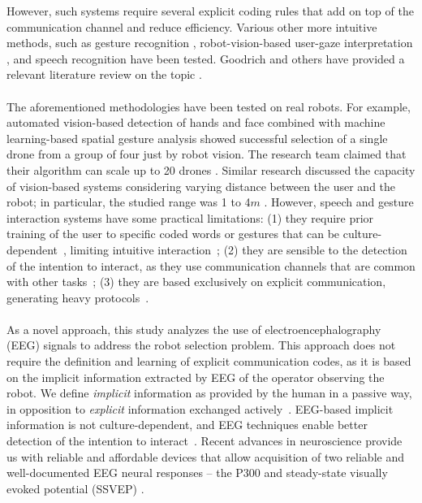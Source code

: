 \documentclass[smallextended]{svjour3}
\begin{document}
However, such systems require several explicit coding rules that add on top of the communication channel and reduce efficiency. 
Various other more intuitive methods, such as gesture recognition \cite{Couture-Beil2010,Jones2010,Monajjemi2013,Nagietal2014}, robot-vision-based user-gaze interpretation \cite{Couture-Beil2010,Monajjemi2013,Pourmehr2013}, and speech recognition \cite{Pourmehr2013} have been tested. 
Goodrich and others have provided a relevant literature review on the topic \cite{goodrich2007human,Rule2012,yanco2004classifying}.\\
\\
The aforementioned methodologies have been tested on real robots. For example, automated vision-based detection of hands and face combined with machine learning-based spatial gesture analysis showed successful selection of a single drone from a group of four just by robot vision. 
The research team claimed that their algorithm can scale up to 20 drones \cite{Nagietal2014}. Similar research discussed the capacity of vision-based systems considering varying distance between the user and the robot; in particular, the studied range was 1 to 4$m$ \cite{Couture-Beil2010}. 
However, speech and gesture interaction systems have some practical limitations: (1) they require prior training of the user to specific coded words or gestures that can be culture-dependent~\cite{Trovato2013}, limiting intuitive interaction~\cite{Kirchner2015};
(2) they are sensible to the detection of the intention to interact, as they use communication channels that are common with other tasks~\cite{Rzepecki2012}; (3) they are based exclusively on explicit communication, generating heavy protocols~\cite{Kirchner2015}.\\
\\ 
As a novel approach, this study analyzes the use of electroencephalography (EEG) signals to address the robot selection problem. 
This approach does not require the definition and learning of explicit communication codes, as it is based on the implicit information extracted by EEG of the operator observing the robot. 
We define \textit{implicit} information as provided by the human in a passive way, in opposition to \textit{explicit} information exchanged actively~\cite{Kirchner2015}.
EEG-based implicit information is not culture-dependent, and EEG techniques enable better detection of the intention to interact~\cite{Rzepecki2012}.
Recent advances in neuroscience provide us with reliable and affordable devices that allow acquisition of two reliable and well-documented EEG neural responses -- the P300 and steady-state visually evoked potential (SSVEP) \cite{Beverina2003,Bi2013,Zhu2010}. 
\end{document}
